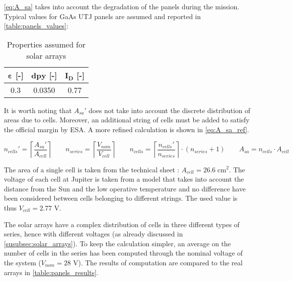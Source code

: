 \autoref{eq:A_sa} takes into account the degradation of the panels during the mission.
Typical values for GaAs UTJ panels are assumed and reported in \autoref{table:panels_values}:

\begin{table}[H]
    \renewcommand{\arraystretch}{1.3}
    \centering
    \small
    \begin{tabular}{|c|c|c|}
        \hline
        $\boldsymbol{\varepsilon}$ \textbf{[-]}    &
        $\boldsymbol{dpy}$ \textbf{[-]}     &
        $\boldsymbol{I_D}$ \textbf{[-]}     \\
        \hline
        \hline
        0.3 & 0.0350 & 0.77 \\
        \hline
    \end{tabular}
    \caption{Properties assumed for solar arrays}
    \label{table:panels_values}
\end{table}
\vspace*{-3mm}

It is worth noting that $A_{sa}'$ does not take into account the discrete distribution of areas due to cells.
Moreover, an additional string of cells must be added to satisfy the official margin by ESA. \cite{esa_margins}
A more refined calculation is shown in \autoref{eq:A_sa_ref}.

\begin{equation}
    n_{cells}' = \left\lceil \frac{A_{sa}'}{A_{cell}} \right\rceil \qquad
    n_{series} = \left\lceil \frac{V_{nom}}{V_{cell}} \right\rceil \qquad
    n_{cells} = \left\lceil \frac{n_{cells}'}{n_{series}} \right\rceil
                \cdot \left( n_{series} + 1 \right) \qquad
    A_{sa} = n_{cells} \cdot A_{cell}
    \label{eq:A_sa_ref}
\end{equation}

The area of a single cell is taken from the technical sheet \cite{solar_datasheet}: $A_{cell} = 26.6 \; \textrm{cm}^2$.
The voltage of each cell at Jupiter is taken from a model\cite{solar_panels_coef} that takes into account the distance from the Sun and the low operative temperature and no difference have been considered between cells belonging to different strings. The used value is thus $V_{cell} = 2.77$ V.

The solar arrays have a complex distribution of cells in three different types of series, hence with different voltages (as already discussed in \autoref{susubsec:solar_arrays}). %
To keep the calculation simpler, an average on the number of cells in the series has been computed through the nominal voltage of the system ($V_{nom} = 28$ V).
The results of computation are compared to the real arrays in \autoref{table:panels_results}.


